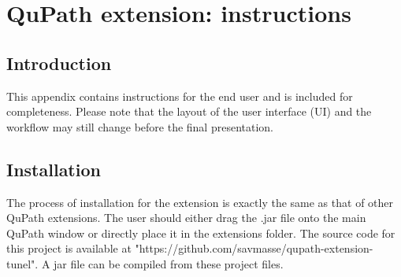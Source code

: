 
\begin{comment}

\chapter{QuPath implementation details}

\section{Introduction}
The active learning technique discussed in 
this thesis was implemented as a QuPath extension.

\section{Implementation}
\par Java is one of the most popular programming languages for application development. It is, however, not very popular for scientific computing. Python has recently become the go-to language for image-processing and machine learning, mainly because the scientific libraries are open-source so that researchers can easily add their contributions. 

\par All simulations during this thesis were run in Python because it allows for much easier prototyping. The OpenCV library   \cite{open-cv} was used both in the python code as in the java implementation, so performance will be very similar if not exactly the same in most cases. Both libraries are essentially ports of the original C++ OpenCV library.

\end{comment}

\chapter{QuPath extension: instructions}

\section{Introduction}
This appendix contains instructions for the end user and is included for completeness. Please note that the layout of the user interface (UI) and the workflow may still change before the final presentation.

\section{Installation}
The process of installation for the extension is exactly the same as that of other QuPath extensions. The user should either drag the .jar file onto the main QuPath window or directly place it in the extensions folder. The source code for this project is available at "https://github.com/savmasse/qupath-extension-tunel". A jar file can be compiled from these project files.  

